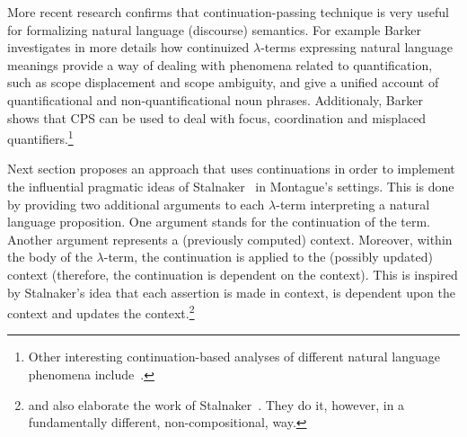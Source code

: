More recent research confirms that continuation-passing technique is very useful for formalizing natural language (discourse) semantics. For example Barker~\cite{Barker:2002:Continuations-and-the-Nature-of-Quantification} investigates in more details how continuized $\lambda$-terms expressing natural language meanings provide a way of dealing with phenomena related to quantification, such as scope displacement and scope ambiguity, and give a unified account of quantificational and non-quantificational noun phrases. Additionaly, Barker~\cite{Barker:2004:Continuations-in-Natural-Language} shows that CPS can be used to deal with focus, coordination and misplaced quantifiers.\footnote{Other interesting continuation-based analyses of different natural language phenomena include~\cite{Shan:2002:A-continuation-semantics-of-interrogatives-that-accounts-for-Bakers-ambiguity,Shan:2004:Delimited-continuations-in-natural-language,BarkerShan:2008:Donkey-Anaphora-is-In-Scope-Binding}.}


Next section proposes an approach that uses continuations in order to implement the influential pragmatic ideas of Stalnaker~\cite{Stalnaker:1978:Assertion} in Montague's settings. This is done by providing two additional arguments to each $\lambda$-term interpreting a natural language proposition. One argument stands for the continuation of the term. Another argument represents a (previously computed) context. Moreover, within the body of the $\lambda$-term, the continuation is applied to the (possibly updated) context (therefore, the continuation is dependent on the context). This is inspired by Stalnaker's idea that each assertion is made in context, is dependent upon the context and updates the context.\footnote{\cite{Heim:1982:The-Semantics-of-Definite-and-Indefinite-Noun-Phrases} and \cite{Kamp:1981:A-Theory-of-Truth-and-Semantic-Representation} also elaborate the work of Stalnaker~\cite{Stalnaker:1978:Assertion}. They do it, however, in a fundamentally different, non-compositional, way. }